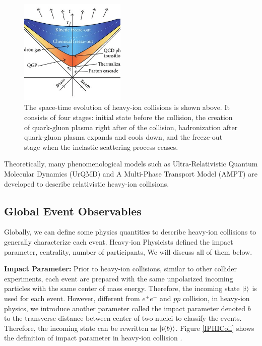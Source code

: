 \begin{figure}[hbtp]
\begin{center}
\includegraphics[width=0.45\textwidth]{Figures/Chapter1/HICSTEvolve.png}
\caption{The space-time evolution of heavy-ion collisions is shown above. It consists of four stages: initial state before the collision, the creation of quark-gluon plasma right after of the collision, hadronization after quark-gluon plasma expands and cools down, and the freeze-out stage when the inelastic scattering process ceases.}
\label{CERNAccComplex}
\end{center}
\end{figure} 

Theoretically, many phenomenological models such as Ultra-Relativistic Quantum Molecular Dynamics (UrQMD) and A Multi-Phase Transport Model (AMPT) are developed to describe relativistic heavy-ion collisions. 


\subsection{Global Event Observables}

Globally, we can define some physics quantities to describe heavy-ion collisions to generally characterize each event. Heavy-ion Physicists defined the impact parameter, centrality, number of participants, We will discuss all of them below.

\textbf{Impact Parameter:} Prior to heavy-ion collisions, similar to other collider experiments, each event are prepared with the same unpolarized incoming particles with the same center of mass energy. Therefore, the incoming state $\ket{i}$ is used for each event. However, different from $e^+ e^-$ and $pp$ collision, in heavy-ion physics, we introduce another parameter called the impact parameter denoted $b$ to the transverse distance between center of two nuclei to classify the events. Therefore, the incoming state can be rewritten as  $\ket{i (b)}$. Figure \ref{IPHIColl} shows the definition of impact parameter in heavy-ion collision \cite{IPHICText}.

